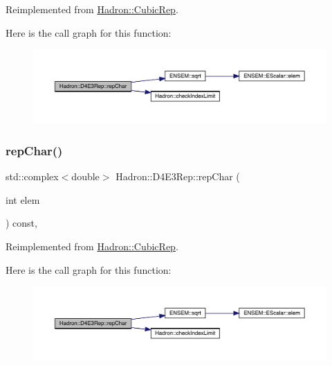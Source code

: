 Reimplemented from \mbox{\hyperlink{structHadron_1_1CubicRep_af45227106e8e715e84b0af69cd3b36f8}{Hadron\+::\+Cubic\+Rep}}.

Here is the call graph for this function\+:
\nopagebreak
\begin{figure}[H]
\begin{center}
\leavevmode
\includegraphics[width=350pt]{dc/d81/structHadron_1_1D4E3Rep_afd42741649d0a7906d6232710f1522aa_cgraph}
\end{center}
\end{figure}
\mbox{\label{structHadron_1_1D4E3Rep_afd42741649d0a7906d6232710f1522aa}} 
\subsubsection{\texorpdfstring{repChar()}{repChar()}\hspace{0.1cm}{\footnotesize\ttfamily [3/3]}}
{\footnotesize\ttfamily std\+::complex$<$double$>$ Hadron\+::\+D4\+E3\+Rep\+::rep\+Char (\begin{DoxyParamCaption}\item[{int}]{elem }\end{DoxyParamCaption}) const\hspace{0.3cm}{\ttfamily [inline]}, {\ttfamily [virtual]}}



Reimplemented from \mbox{\hyperlink{structHadron_1_1CubicRep_af45227106e8e715e84b0af69cd3b36f8}{Hadron\+::\+Cubic\+Rep}}.

Here is the call graph for this function\+:
\nopagebreak
\begin{figure}[H]
\begin{center}
\leavevmode
\includegraphics[width=350pt]{dc/d81/structHadron_1_1D4E3Rep_afd42741649d0a7906d6232710f1522aa_cgraph}
\end{center}
\end{figure}
\mbox{\label{structHadron_1_1D4E3Rep_a313affd6d58648cb82e7095ada7afa8d}} 
